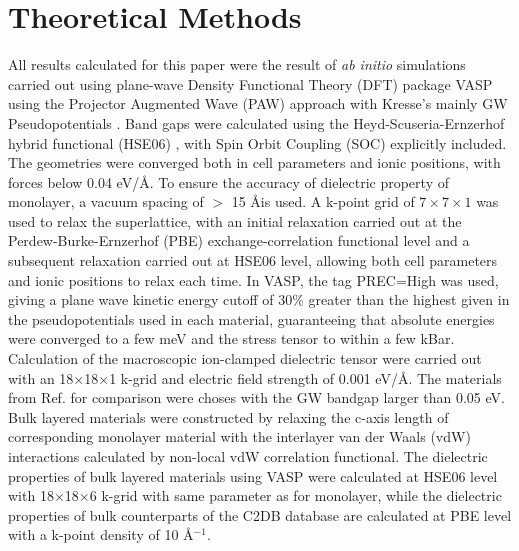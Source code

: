 \documentclass[journal=ancac3,manuscript=article,email=true,hyperref=true,keywords=false]{achemso}
\begin{document}
\section{Theoretical Methods}
\label{sec:org8457dbb}

All results calculated for this paper were the result of \emph{ab
  initio} simulations carried out using plane-wave Density Functional
Theory (DFT) package VASP
\cite{Kresse_1993,Kresse_1996_1,Kresse_1996_2} using the Projector
Augmented Wave (PAW) approach with Kresse's mainly GW Pseudopotentials
\cite{Kresse_1999_pseudopotentials}. Band gaps were calculated using
the Heyd-Scuseria-Ernzerhof hybrid functional (HSE06)
\cite{Heyd_2003,HSE_2006}, with Spin Orbit Coupling (SOC) explicitly
included. The geometries were converged both in cell parameters and
ionic positions, with forces below 0.04 eV/\AA. To ensure the accuracy
of dielectric property of monolayer, a vacuum spacing of $>$ 15 \AA is
used. A k-point grid of \(7\times7\times1\) was used to relax the
superlattice, with an initial relaxation carried out at the
Perdew-Burke-Ernzerhof
(PBE)\cite{Perdew_1996,Ernzerhof_1999,Paier_2005_PBE}
exchange-correlation functional level and a subsequent relaxation
carried out at HSE06 level, allowing both cell parameters and ionic
positions to relax each time. In VASP, the tag PREC=High was used,
giving a plane wave kinetic energy cutoff of 30\% greater than the
highest given in the pseudopotentials used in each material,
guaranteeing that absolute energies were converged to a few meV and
the stress tensor to within a few kBar.  Calculation of the
macroscopic ion-clamped dielectric tensor were carried out with an
18$\times$18$\times$1 k-grid and electric field strength of 0.001
eV/\AA. The materials from Ref.  for comparison
were choses with the GW bandgap larger than 0.05 eV. Bulk layered
materials were constructed by relaxing the c-axis length of
corresponding monolayer material with the interlayer van der Waals
(vdW) interactions calculated by non-local vdW correlation
functional\cite{Lee_2010_vdFD2}.  The dielectric properties of bulk
layered materials using VASP were calculated at HSE06 level with
18$\times$18$\times$6 k-grid with same parameter as for monolayer,
while the dielectric properties of bulk counterparts of the C2DB
database are calculated at PBE level with a k-point density of 10
\AA$^{-1}$.




\end{document}
